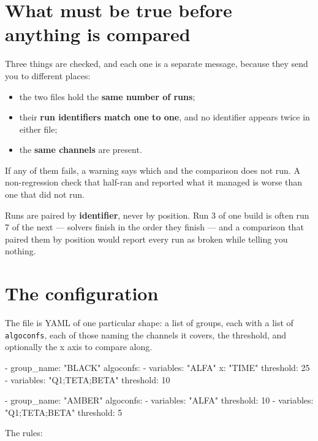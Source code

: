 \documentclass[11pt,a4paper,oneside]{report}
\newcommand{\code}[1]{\texttt{#1}}
\begin{document}
\section{What must be true before anything is compared}

Three things are checked, and each one is a separate message, because they send
you to different places:

\begin{itemize}
\item the two files hold the \textbf{same number of runs};
\item their \textbf{run identifiers match one to one}, and no identifier
      appears twice in either file;
\item the \textbf{same channels} are present.
\end{itemize}

If any of them fails, a warning says which and the comparison does not run. A
non-regression check that half-ran and reported what it managed is worse than
one that did not run.

Runs are paired by \textbf{identifier}, never by position. Run 3 of one build
is often run 7 of the next --- solvers finish in the order they finish --- and
a comparison that paired them by position would report every run as broken
while telling you nothing.

\section{The configuration}
\label{sec:diffconfig}

The file is YAML of one particular shape: a list of groups, each with a list of
\code{algoconfs}, each of those naming the channels it covers, the threshold,
and optionally the x axis to compare along.

\begin{aoecode}
 - group_name: "BLACK"
   algoconfs:
     - variables: "ALFA"
       x: "TIME"
       threshold: 25
     - variables: "Q1;TETA;BETA"
       threshold: 10

 - group_name: "AMBER"
   algoconfs:
     - variables: "ALFA"
       threshold: 10
     - variables: "Q1;TETA;BETA"
       threshold: 5
\end{aoecode}

The rules:
\end{document}
